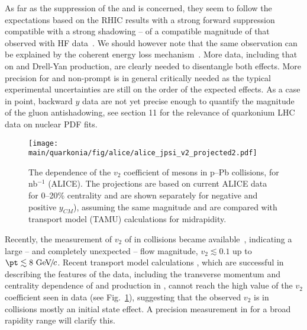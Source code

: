 \documentclass[../report.tex]{subfiles}
\providecommand{\main}{..}
\begin{document}
As far as the suppression of the  and \PJgy is concerned, they seem to follow the expectations based on the RHIC results with a strong forward suppression compatible with a strong shadowing -- of a compatible magnitude of that observed with HF data~\cite{Kusina:2017gkz}. We should however note that the same observation can be explained by the coherent energy loss mechanism~\cite{Arleo:2010rb}. More data, including that on \PGU and Drell-Yan production, are clearly needed to disentangle both effects. More precision for \PGU and non-prompt \PJgy is in general critically needed as the typical experimental uncertainties are still on the order of the expected effects. As a case in point, backward $y$ data are not yet precise enough to quantify the magnitude of the gluon antishadowing, see section 11 for the relevance of quarkonium \pPb LHC data on nuclear PDF fits.

\begin{figure}[h]
 \begin{center}
  \texttt{[image: \\main/quarkonia/fig/alice/alice\_jpsi\_v2\_projected2.pdf]}
 \end{center}
 \caption{The \pT dependence of the $v_2$ coefficient of \PJgy mesons in p--Pb collisions, for \unit[500]{nb}$^{-1}$ (ALICE). The projections are based on current ALICE data for 0--20\% centrality \cite{Acharya:2017tfn}  and are shown separately for negative and positive $y_{CM}$), assuming the same magnitude and are compared with transport model (TAMU) calculations \cite{Du:2018wsj} for midrapidity.}
\label{FigQ:v2pTpPb}
\end{figure}

Recently, the measurement of $v_2$ of \PJgy in \pPb collisions became available~\cite{Acharya:2017tfn,Sirunyan:2018kiz}, indicating a large -- and completely unexpected -- flow magnitude, $v_2 \lesssim 0.1$ up to $\pt \lesssim 8\UGeVc$.
Recent transport model calculations \cite{Du:2018wsj}, which are successful in describing the features of the data, including the transverse momentum and centrality dependence of  \PJgy  and  production in \pPb, cannot reach the high value of the $v_2$ coefficient seen in data \cite{Acharya:2017tfn,Sirunyan:2018kiz} (see Fig.~\ref{FigQ:v2pTpPb}),
suggesting that the observed $v_2$ is in \pPb collisions mostly an initial state effect.
A precision measurement in \RunsThreeFour for a broad rapidity range %
will clarify this.
\end{document}
